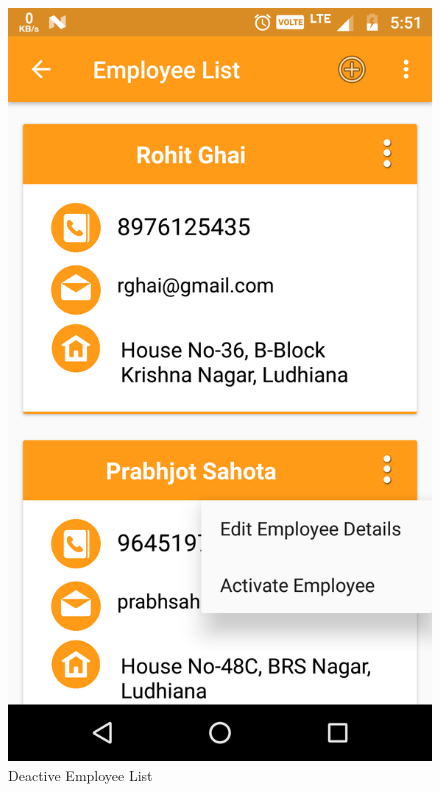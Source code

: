 \\
\begin{figure}[h]
	\centering
	\includegraphics[width=0.7\linewidth]{DeactiveEmployeeList}
	\caption{Deactive Employee List}
\end{figure}
\pagebreak

